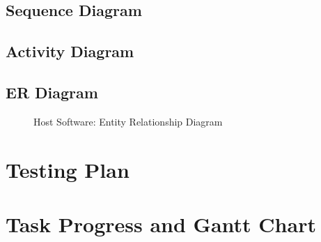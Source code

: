 \documentclass[12pt]{article}
\begin{document}
\subsection{Sequence Diagram}
\subsection{Activity Diagram}
\subsection{ER Diagram}
\begin{figure}[H]
	\caption{Host Software: Entity Relationship Diagram}
\end{figure}
\section{Testing Plan}
\section{Task Progress and Gantt Chart}
\end{document}
